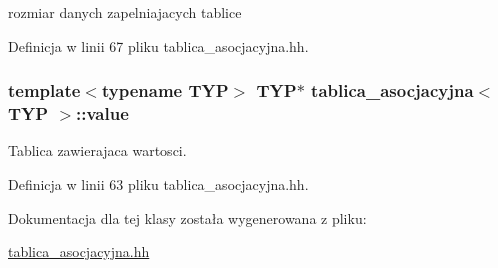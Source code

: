 rozmiar danych zapelniajacych tablice 



\-Definicja w linii 67 pliku tablica\-\_\-asocjacyjna.\-hh.

\hypertarget{classtablica__asocjacyjna_a28719743b86b0a16db652afda20b665c}{
\subsubsection[{value}]{\setlength{\rightskip}{0pt plus 5cm}template$<$typename \-T\-Y\-P$>$ \-T\-Y\-P$\ast$ {\bf tablica\-\_\-asocjacyjna}$<$ \-T\-Y\-P $>$\-::{\bf value}}}\label{classtablica__asocjacyjna_a28719743b86b0a16db652afda20b665c}


\-Tablica zawierajaca wartosci. 



\-Definicja w linii 63 pliku tablica\-\_\-asocjacyjna.\-hh.



\-Dokumentacja dla tej klasy została wygenerowana z pliku\-:\begin{DoxyCompactItemize}
\item 
\hyperlink{tablica__asocjacyjna_8hh}{tablica\-\_\-asocjacyjna.\-hh}\end{DoxyCompactItemize}
